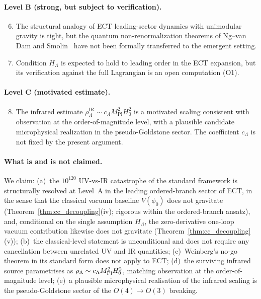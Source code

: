 \paragraph{Level B (strong, but subject to verification).}
\begin{enumerate}
\setcounter{enumi}{5}
\item The structural analogy of ECT leading-sector dynamics with
unimodular gravity is tight, but the quantum non-renormalization
theorems of Ng--van Dam and
Smolin~\cite{NgVanDam1990,Smolin2009} have not been formally
transferred to the emergent setting.
\item Condition $H_\Lambda$ is expected to hold to leading order in the ECT
expansion, but its verification against the full Lagrangian is an
open computation (O1).
\end{enumerate}

\paragraph{Level C (motivated estimate).}
\begin{enumerate}
\setcounter{enumi}{7}
\item The infrared estimate $\rho_\Lambda^{\mathrm{IR}} \sim c_\Lambda
M_{\mathrm{Pl}}^2 H_0^2$ is a motivated scaling consistent with
observation at the order-of-magnitude level, with a plausible
candidate microphysical realization in the pseudo-Goldstone sector.
The coefficient $c_\Lambda$ is not fixed by the present argument.
\end{enumerate}
\paragraph{What is and is not claimed.}
We claim: (a)~the $10^{120}$ UV-vs-IR catastrophe of the standard
framework is structurally resolved at Level~A in the leading
ordered-branch sector of ECT, in the sense that the classical
vacuum baseline $V(\phi_0)$ does not gravitate
(Theorem~\ref{thm:cc_decoupling}(iv); rigorous within the ordered-branch ansatz), and,
conditional on the single assumption $H_\Lambda$, the zero-derivative one-loop
vacuum contribution likewise does not gravitate (Theorem~\ref{thm:cc_decoupling}(v));
(b)~the classical-level statement is unconditional and does not
require any cancellation between unrelated UV and IR quantities;
(c)~Weinberg's no-go theorem in its standard form does not apply
to ECT; (d)~the surviving infrared source parametrises as
$\rho_\Lambda\sim c_\Lambda M_{\rm Pl}^2 H_0^2$, matching observation
at the order-of-magnitude level; (e)~a plausible microphysical
realisation of the infrared scaling is the pseudo-Goldstone sector
of the $O(4)\to O(3)$ breaking.

